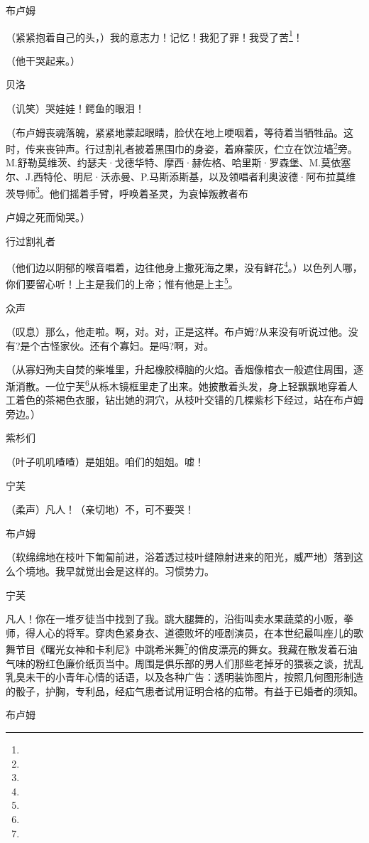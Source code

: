 \par 布卢姆
\par （紧紧抱着自己的头，）我的意志力！记忆！我犯了罪！我受了苦\footnote{}！
\par （他干哭起来。）
\par 贝洛
\par （讥笑）哭娃娃！鳄鱼的眼泪！
\par （布卢姆丧魂落魄，紧紧地蒙起眼睛，脸伏在地上哽咽着，等待着当牺牲品。这时，传来丧钟声。行过割礼者披着黑围巾的身姿，着麻蒙灰，伫立在饮泣墙\footnote{}旁。M.舒勒莫维茨、约瑟夫·戈德华特、摩西·赫佐格、哈里斯·罗森堡、M.莫依塞尔、J.西特伦、明尼·沃赤曼、P.马斯添斯基，以及领唱者利奥波德·阿布拉莫维茨导师\footnote{}。他们摇着手臂，呼唤着圣灵，为哀悼叛教者布
\par 卢姆之死而恸哭。）
\par 行过割礼者
\par （他们边以阴郁的喉音唱着，边往他身上撒死海之果，没有鲜花\footnote{}。）以色列人哪，你们要留心听！上主是我们的上帝；惟有他是上主\footnote{}。
\par 众声
\par （叹息）那么，他走啦。啊，对。对，正是这样。布卢姆?从来没有听说过他。没有?是个古怪家伙。还有个寡妇。是吗?啊，对。
\par （从寡妇殉夫自焚的柴堆里，升起橡胶樟脑的火焰。香烟像棺衣一般遮住周围，逐渐消散。一位宁芙\footnote{}从栎木镜框里走了出来。她披散着头发，身上轻飘飘地穿着人工着色的茶褐色衣服，钻出她的洞穴，从枝叶交错的几棵紫杉下经过，站在布卢姆旁边。）
\par 紫杉们
\par （叶子叽叽喳喳）是姐姐。咱们的姐姐。嘘！
\par 宁芙
\par （柔声）凡人！（亲切地）不，可不要哭！
\par 布卢姆
\par （软绵绵地在枝叶下匍匐前进，浴着透过枝叶缝隙射进来的阳光，威严地）落到这么个境地。我早就觉出会是这样的。习惯势力。
\par 宁芙
\par 凡人！你在一堆歹徒当中找到了我。跳大腿舞的，沿街叫卖水果蔬菜的小贩，拳师，得人心的将军。穿肉色紧身衣、道德败坏的哑剧演员，在本世纪最叫座儿的歌舞节目《曙光女神和卡利尼》中跳希米舞\footnote{}的俏皮漂亮的舞女。我藏在散发着石油气味的粉红色廉价纸页当中。周围是俱乐部的男人们那些老掉牙的猥亵之谈，扰乱乳臭未干的小青年心情的话语，以及各种广告：透明装饰图片，按照几何图形制造的骰子，护胸，专利品，经疝气患者试用证明合格的疝带。有益于已婚者的须知。
\par 布卢姆
